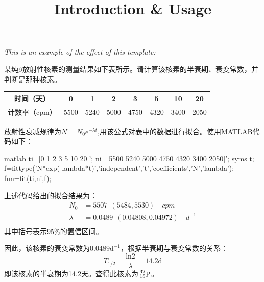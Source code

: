 




\duedate{\today}



\title{\vspace{-1cm} \textbf{Introduction \& Usage} \vspace{-0.5cm}}
\date{}
\inlinemaketitle


\textit{This is an example of the effect of this template:} \\
\vspace{1cm}

\begin{problem}[0]
某纯$\beta$放射性核素的测量结果如下表所示。请计算该核素的半衰期、衰变常数，并判断是那种核素。

    \begin{table}[H]
    \centering
    \label{表格}
    \begin{tabular}{|c|c|c|c|c|c|c|c|}
    \hline
    时间（天） & 0 & 1 & 2 & 3 & 5 & 10 & 20 \\
    \hline
    计数率（cpm） & 5500 & 5240 & 5000 & 4750 & 4320 & 3400 & 2050 \\
    \hline
    \end{tabular}
    \end{table}

\end{problem}

\begin{solution}
  \par
  放射性衰减规律为$N=N_0 e^{-\lambda t}$,用该公式对表中的数据进行拟合。使用MATLAB代码如下：
  \par
\begin{myminted}{matlab}
ti=[0 1 2 3 5 10 20]';
ni=[5500 5240 5000 4750 4320 3400 2050]';
syms t;
f=fittype('N*exp(-lambda*t)','independent','t','coefficients',{'N','lambda'});
fun=fit(ti,ni,f);
\end{myminted}
  \par
  上述代码给出的拟合结果为：
    \[\begin{split}
        N_0     &  = 5507\ \ (5484, 5530) \quad \si{cpm} \\
        \lambda &  = 0.0489\ \ (0.04808, 0.04972) \quad \si{d^{-1}} \\
    \end{split}\]
  其中括号表示95\%的置信区间。
  \par
  因此，该核素的衰变常数为$0.0489 \text{d}^{-1}$，根据半衰期与衰变常数的关系：
    \[T_{1/2}=\frac{\text{ln}2}{\lambda}=14.2  \text{d}\]
  即该核素的半衰期为14.2天。查得此核素为$\sideset{^{32}_{15}}{}{\mathop{\mathrm{P}}}$。
\end{solution}

